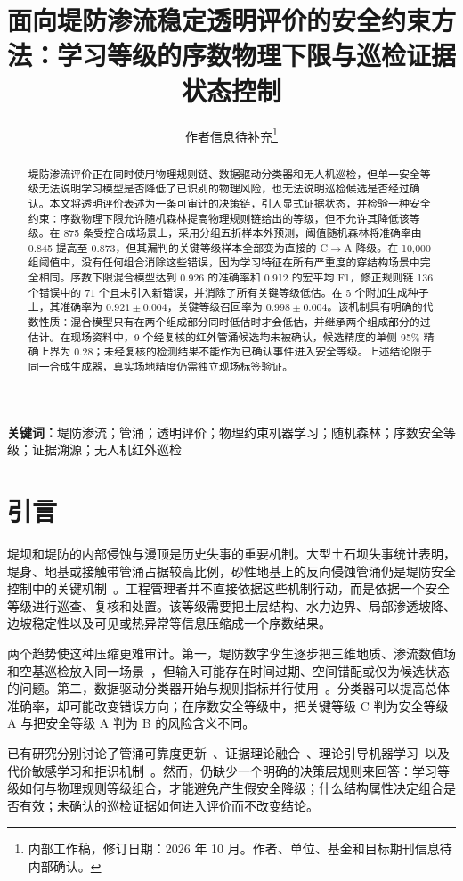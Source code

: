 \documentclass[10pt,twocolumn,a4paper]{ctexart}
\title{面向堤防渗流稳定透明评价的安全约束方法：\newline 学习等级的序数物理下限与巡检证据状态控制}
\author{作者信息待补充\thanks{内部工作稿，修订日期：2026 年 10 月。作者、单位、基金和目标期刊信息待内部确认。}}
\date{}
\begin{document}
\maketitle
\begin{abstract}
堤防渗流评价正在同时使用物理规则链、数据驱动分类器和无人机巡检，但单一安全等级无法说明学习模型是否降低了已识别的物理风险，也无法说明巡检候选是否经过确认。本文将透明评价表述为一条可审计的决策链，引入显式证据状态，并检验一种安全约束：序数物理下限允许随机森林提高物理规则链给出的等级，但不允许其降低该等级。在 875 条受控合成场景上，采用分组五折样本外预测，阈值随机森林将准确率由 0.845 提高至 0.873，但其漏判的关键等级样本全部变为直接的 C$\rightarrow$A 降级。在 10,000 组阈值中，没有任何组合消除这些错误，因为学习特征在所有严重度的穿结构场景中完全相同。序数下限混合模型达到 0.926 的准确率和 0.912 的宏平均 F1，修正规则链 136 个错误中的 71 个且未引入新错误，并消除了所有关键等级低估。在 5 个附加生成种子上，其准确率为 $0.921\pm0.004$，关键等级召回率为 $0.998\pm0.004$。该机制具有明确的代数性质：混合模型只有在两个组成部分同时低估时才会低估，并继承两个组成部分的过估计。在现场资料中，9 个经复核的红外管涌候选均未被确认，候选精度的单侧 95\% 精确上界为 0.28；未经复核的检测结果不能作为已确认事件进入安全等级。上述结论限于同一合成生成器，真实场地精度仍需独立现场标签验证。
\end{abstract}
\noindent\textbf{关键词：}堤防渗流；管涌；透明评价；物理约束机器学习；随机森林；序数安全等级；证据溯源；无人机红外巡检

\section{引言}
堤坝和堤防的内部侵蚀与漫顶是历史失事的重要机制。大型土石坝失事统计表明，堤身、地基或接触带管涌占据较高比例，砂性地基上的反向侵蚀管涌仍是堤防安全控制中的关键机制~\cite{Foster2000,vanBeek2015}。工程管理者并不直接依据这些机制行动，而是依据一个安全等级进行巡查、复核和处置。该等级需要把土层结构、水力边界、局部渗透坡降、边坡稳定性以及可见或热异常等信息压缩成一个序数结果。

两个趋势使这种压缩更难审计。第一，堤防数字孪生逐步把三维地质、渗流数值场和空基巡检放入同一场景~\cite{Fuller2020,Hou}，但输入可能存在时间过期、空间错配或仅为候选状态的问题。第二，数据驱动分类器开始与规则指标并行使用~\cite{Xu,Chen}。分类器可以提高总体准确率，却可能改变错误方向；在序数安全等级中，把关键等级 C 判为安全等级 A 与把安全等级 A 判为 B 的风险含义不同。

已有研究分别讨论了管涌可靠度更新~\cite{Schweckendiek,Roscoe,Baecher2003}、证据理论融合~\cite{Shafer1976,Chen}、理论引导机器学习~\cite{Karpatne2017,Rudin2019}以及代价敏感学习和拒识机制~\cite{Elkan2001,Chow1970,Geifman2017}。然而，仍缺少一个明确的决策层规则来回答：学习等级如何与物理规则等级组合，才能避免产生假安全降级；什么结构属性决定组合是否有效；未确认的巡检证据如何进入评价而不改变结论。
\end{document}
